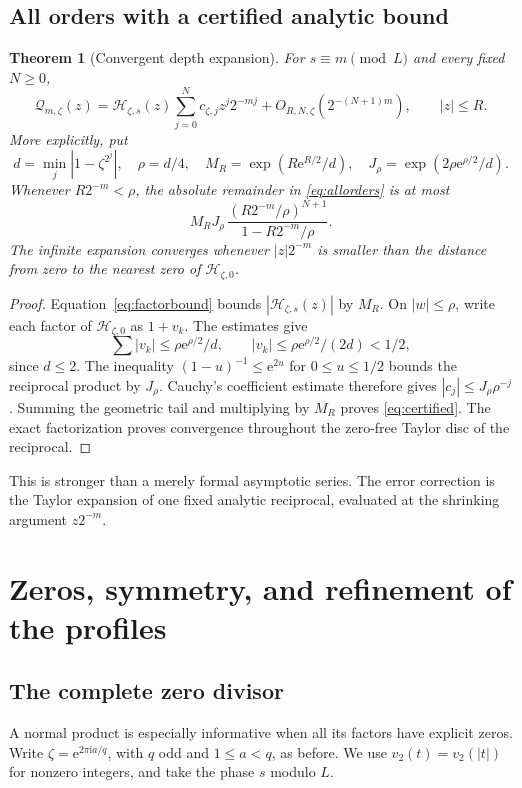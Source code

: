 \documentclass[11pt,letterpaper]{article}
\numberwithin{equation}{section}
\newtheorem{theorem}{Theorem}[section]
\theoremstyle{definition}
\theoremstyle{remark}
\newcommand{\ii}{\mathrm i}
\newcommand{\Hp}{\mathcal H}
\newcommand{\Qp}{\mathcal Q}
\newcommand{\e}{\mathrm e}
\begin{document}
\subsection{All orders with a certified analytic bound}
\begin{theorem}[Convergent depth expansion]
\label{thm:correction}
For \(s\equiv m\pmod L\) and every fixed \(N\geq0\),
\begin{equation}
 \Qp_{m,\zeta}(z)
 =\Hp_{\zeta,s}(z)\sum_{j=0}^N c_{\zeta,j}z^j2^{-mj}
       +O_{R,N,\zeta}(2^{-(N+1)m}),\qquad |z|\leq R.
 \label{eq:allorders}
\end{equation}
More explicitly, put
\[
 d=\min_j|1-\zeta^{2^j}|,\quad \rho=d/4,\quad
 M_R=\exp(R\e^{R/2}/d),\quad
 J_\rho=\exp(2\rho\e^{\rho/2}/d).
\]
Whenever \(R2^{-m}<\rho\), the absolute remainder in \eqref{eq:allorders} is at most
\begin{equation}
 M_RJ_\rho\,
 \frac{(R2^{-m}/\rho)^{N+1}}{1-R2^{-m}/\rho}.
 \label{eq:certified}
\end{equation}
The infinite expansion converges whenever \(|z|2^{-m}\) is smaller than the distance from zero to the nearest zero of \(\Hp_{\zeta,0}\).
\end{theorem}
\begin{proof}
Equation~\eqref{eq:factorbound} bounds \(|\Hp_{\zeta,s}(z)|\) by \(M_R\). On \(|w|\leq\rho\), write each factor of \(\Hp_{\zeta,0}\) as \(1+v_k\). The estimates give
\[
 \sum|v_k|\leq\rho\e^{\rho/2}/d,
 \qquad |v_k|\leq\rho\e^{\rho/2}/(2d)<1/2,
\]
since \(d\leq2\). The inequality \((1-u)^{-1}\leq\e^{2u}\) for \(0\leq u\leq1/2\) bounds the reciprocal product by \(J_\rho\). Cauchy's coefficient estimate therefore gives \(|c_j|\leq J_\rho\rho^{-j}\). Summing the geometric tail and multiplying by \(M_R\) proves \eqref{eq:certified}. The exact factorization proves convergence throughout the zero-free Taylor disc of the reciprocal.
\end{proof}

This is stronger than a merely formal asymptotic series. The error correction is the Taylor expansion of one fixed analytic reciprocal, evaluated at the shrinking argument \(z2^{-m}\).

\section{Zeros, symmetry, and refinement of the profiles}
\label{sec:geometry}

\subsection{The complete zero divisor}
A normal product is especially informative when all its factors have explicit zeros. Write \(\zeta=\e^{2\pi\ii a/q}\), with \(q\) odd and \(1\leq a<q\), as before. We use \(v_2(t)=v_2(|t|)\) for nonzero integers, and take the phase \(s\) modulo \(L\).
\end{document}
